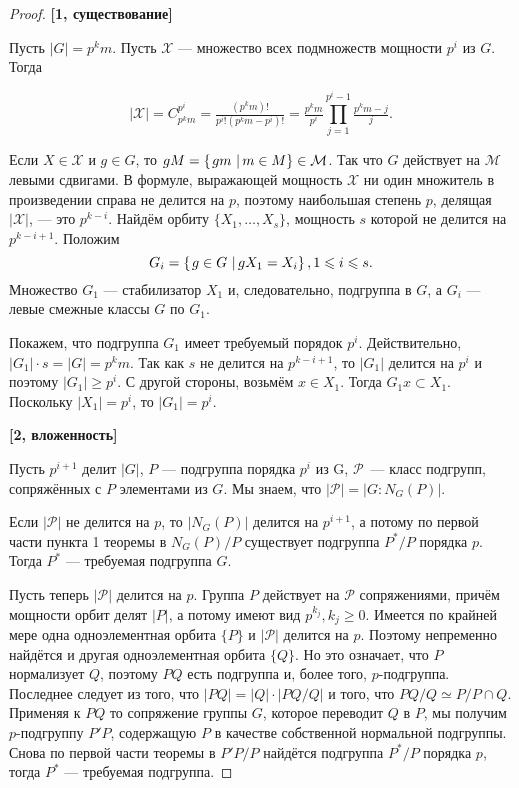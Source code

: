 \begin{proof}
	\hfill
	
	\textbf{[1, существование]} 
	
	Пусть $ |G| = p^km $.
	Пусть $\mathcal{X}$ --- множество всех подмножеств мощности $p^i$ из $G$.
	Тогда
	
	$$ |\mathcal{X}| = C_{p^km}^{p^i} = 
	\tfrac{(p^km)!}{p^i! (p^km - p^i)!} =
	\tfrac{p^km}{p^i} \prod\limits_{j = 1}^{p^i - 1} \tfrac{p^km - j}{j}. $$ 
	
	Если $ X \in \mathcal{X} $ и $ g \in G $, то $ gM = \left\{ \left. gm \ \right\vert m \in M \right\} \in \mathcal{M} $.
	Так что $ G $ действует на $\mathcal{M}$ левыми сдвигами.
	В формуле, выражающей мощность $ \mathcal{X} $ 
	ни один множитель в произведении справа не делится на $ p $, поэтому
	наибольшая степень $ p $, делящая $ |\mathcal{X}| $, --- это $ p^{k-i} $. 
	Найдём орбиту $ \{X_1, \ldots, X_s\} $, мощность $ s $ которой не делится на $p^{k-i+1}$. 
	Положим 
	$$ G_i= \left\{ \left. g \in G \ \right\vert gX_1 = X_i \right\}, 1\leqslant i\leqslant s. $$
	Множество $ G_1 $ --- стабилизатор $ X_1 $ и, следовательно, 
	подгруппа в $ G $, 
	а $ G_i $ --- левые смежные классы $ G $ по $ G_1 $. 
	
	Покажем, что подгруппа $ G_1 $ имеет требуемый порядок $p^i$.
	Действительно, $ |G_1| \cdot s = |G| = p^km $.
	Так как $ s $ не делится на $ p^{k - i + 1} $,
	то $ |G_1| $ делится на $ p^i $ и поэтому $ |G_1| \geqslant p^i $.
	С другой стороны, возьмём $ x \in X_1 $. Тогда $ G_1x \subset X_1 $.
	Поскольку $ |X_1| = p^{i} $, то $ |G_1| = p^i $.
	
	\textbf{[2, вложенность]}
	
	Пусть $ p^{i+1} $ делит $ |G| $, $ P $ --- подгруппа порядка $ p^i $ из G, $ \mathcal{P} $~--- класс подгрупп, сопряжённых с $ P $ элементами из $ G $.
	Мы знаем, что $ |\mathcal{P}|=|G:N_G(P)| $. 
	
	Если $ |\mathcal{P}| $ не делится на $ p $, то $ |N_G(P)| $ делится на $ p^{i+1} $, 
	а потому по первой части пункта 1 теоремы в $ N_G(P)/P $ существует подгруппа $ P^\ast/P $ порядка $p$. Тогда $ P^\ast $ --- требуемая подгруппа $ G $.
	
	Пусть теперь $|\mathcal{P}|$ делится на $p$. Группа $ P $ действует на $\mathcal{P}$ сопряжениями, причём мощности орбит делят $|P|$,
	а потому имеют вид $p^{k_j}, k_j\geqslant 0$.
	Имеется по крайней мере одна одноэлементная орбита $\{P\}$ и $|\mathcal{P}|$ делится на $p$.
	Поэтому непременно найдётся и другая одноэлементная орбита $\{Q\}$. 
	Но это означает, что $ P $ нормализует $ Q $, поэтому $ PQ $ есть подгруппа и, более того, $p$-подгруппа.
	Последнее следует из того, что $|PQ| = |Q|\cdot |PQ/Q|$ и того, что 
	$ PQ/Q\simeq P/P\cap Q $.
	Применяя к $ PQ $ то сопряжение группы $ G $, которое переводит $ Q $ в $ P $, мы получим $p$-подгруппу $P'P$, содержащую $P$ в качестве собственной нормальной подгруппы.
	Снова по первой части теоремы в $P'P/P$ найдётся подгруппа $P^\ast/P$ порядка $p$, тогда $P^\ast$ --- требуемая подгруппа.


\end{proof}
